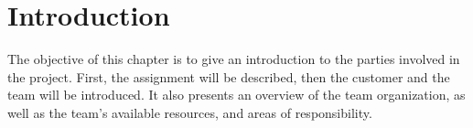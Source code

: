 \chapter{Introduction}
The objective of this chapter is to give an introduction to the parties involved in the project. First, the assignment will be described, then the customer and the team will be introduced.
It also presents an overview of the team organization, as well as the team's available resources, and areas of responsibility.





\newpage

